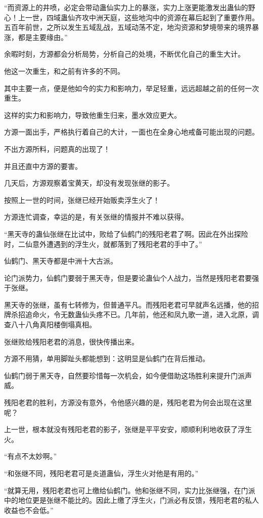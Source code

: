 \begin{this_body}
“而资源上的井喷，必定会带动蛊仙实力上的暴涨，实力上涨更能激发出蛊仙的野心！上一世，四域蛊仙齐攻中洲天庭，这些地沟中的资源在幕后起到了重要作用。五百年前世，之所以发生五域乱战，五域动荡不定，地沟资源和梦境带来的境界暴涨，都是主要缘由。”

余暇时刻，方源都会分析局势，分析自己的处境，不断优化自己的重生大计。

他这一次重生，和之前有许多的不同。

其中主要一点，便是他如今的实力和影响力，举足轻重，远远超越之前的任何一次重生。

这样的实力和影响力，导致他重生归来，墨水效应更大。

方源一面出手，严格执行着自己的大计，一面也在全身心地戒备可能出现的问题。

不出方源所料，问题真的出现了！

并且还直中方源的要害。

几天后，方源观察着宝黄天，却没有发现张继的影子。

按照上一世的时间，张继已经开始贩卖浮生火了！

方源连忙调查，幸运的是，有关张继的情报并不难以获得。

“黑天寺的蛊仙张继在比试中，败给了仙鹤门的残阳老君了啊。因此在外出探险时，二仙意外遭遇到的浮生火，就都落到了残阳老君的手中了。”

仙鹤门、黑天寺都是中洲十大古派。

论门派势力，仙鹤门要弱于黑天寺，但是要论蛊仙个人战力，当然是残阳老君要强于张继。

黑天寺的张继，虽有七转修为，但普通平凡。而残阳老君可早就声名远播，他的招牌杀招追命火，令无数蛊仙头疼不已。几年前，他还和凤九歌一道，进入北原，调查八十八角真阳楼倒塌真相。

张继败给残阳老君的消息，很快传播出来。

方源不用猜，单用脚趾头都能想到：这明显是仙鹤门在背后推动。

仙鹤门弱于黑天寺，自然要珍惜每一次机会，如今便借助这场胜利来提升门派声威。

残阳老君的胜利，方源没有意外，令他感兴趣的是，残阳老君为何会出现在这里呢？

上一世，根本就没有残阳老君的影子，张继是平平安安，顺顺利利地收获了浮生火。

“有点不太妙啊。”

“和张继不同，残阳老君可是炎道蛊仙，浮生火对他是有用的。”

“就算无用，残阳老君也可上缴给仙鹤门。他和张继不同，实力比张继强，在门派中的地位更是张继不能比的。因此上缴了浮生火，门派必有反馈，残阳老君的私人收益也不会低。”


\end{this_body}
